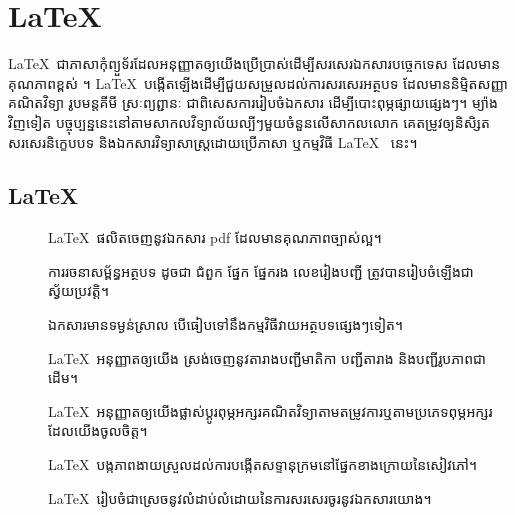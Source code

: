 \documentclass[11pt, a5paper]{article}
\begin{document}
	\section*{\centering \LaTeX {}}
	\quad\LaTeX~ជាភាសាកុំព្យួទ័រដែលអនុញ្ញាតឲ្យយើងប្រើប្រាស់ដើម្បីសរសេរឯកសារបច្ចេកទេស ដែលមានគុណភាពខ្ពស់ ។ \LaTeX~បង្កើតឡើងដើម្បីជួយសម្រួលដល់ការសរសេរអត្ថបទ ដែលមាននិម្មិតសញ្ញាគណិតវិទ្យា រូបមន្តគីមី ស្រៈព្យព្ជានៈ ជាពិសេសការរៀបចំឯកសារ ដើម្បីបោះពុម្ភផ្សាយផ្សេងៗ។ ម្យ៉ាងវិញទៀត បច្ចុប្បន្ននេះនៅតាមសាកលវិទ្យាល័យល្បីៗមួយចំនួនលើសាកលលោក គេតម្រូវឲ្យនិសិ្សតសរសេរនិក្ខេបបទ និងឯកសារវិទ្យាសាស្រ្តដោយប្រើភាសា ឬកម្មវិធី \LaTeX~ នេះ។\\
	\subsection*{\centering \LaTeX~}
	\begin{description}
		\item[] \LaTeX~ផលិតចេញនូវឯកសារ pdf ដែលមានគុណភាពច្បាស់ល្អ។
		\item [] ការរចនាសម្ព័ន្ធអត្ថបទ ដូចជា ជំពួក ផ្នែក ផ្នែករង លេខរៀងបញ្ជី ត្រូវបានរៀបចំឡើងជាស្វ័យប្រវត្តិ។
		\item[] ឯកសារមានទម្ងន់ស្រាល បើធៀបទៅនឹងកម្មវិធីវាយអត្ថបទផ្សេងៗទៀត។
		\item[] \LaTeX~អនុញ្ញាតឲ្យយើង ស្រង់ចេញនូវតារាងបញ្ជីមាតិកា បញ្ជីតារាង និងបញ្ជីរូបភាពជាដើម។
		\item[] \LaTeX~អនុញ្ញាតឲ្យយើងផ្លាស់ប្តូរពុម្ភអក្សរគណិតវិទ្យាតាមតម្រូវការ​ ឬតាមប្រភេទពុម្ភអក្សរដែលយើងចូលចិត្ត។
		\item[] \LaTeX~បង្កភាពងាយស្រួលដល់ការបង្កើតសទ្ទានុក្រមនៅផ្នែកខាងក្រោយនៃសៀវភៅ។
		\item[] \LaTeX~រៀបចំជាស្រេចនូវលំដាប់លំដោយនៃការសរសេរចូរនូវឯកសារយោង។
	\end{description}
\end{document}

